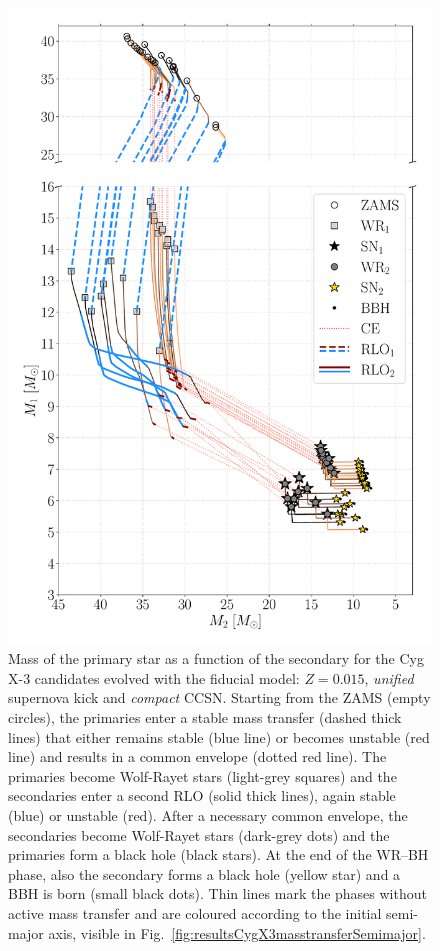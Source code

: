 \documentclass[a4paper,titlepage]{book}     	%
\begin{document}
\begin{figure}[h!]
	\centering
	\includegraphics[width=.9\textwidth]{./images/com_Mass_1_Mass_0_BHBH_GW_WRBH_cyg_x-3--Ko17.pdf}
	\caption{Mass of the primary star as a function of the secondary for the Cyg X-3 candidates evolved with the fiducial model: $Z=0.015$, \emph{unified} supernova kick and \emph{compact} CCSN. Starting from the ZAMS (empty circles), the primaries enter a stable mass transfer (dashed thick lines) that either remains stable (blue line) or becomes unstable (red line) and results in a common envelope (dotted red line). The primaries become Wolf-Rayet stars (light-grey squares) and the secondaries enter a second RLO (solid thick lines), again stable (blue) or unstable (red). After a necessary common envelope, the secondaries become Wolf-Rayet stars (dark-grey dots) and the primaries form a black hole (black stars). At the end of the WR--BH phase, also the secondary forms a black hole (yellow star) and a BBH is born (small black dots). Thin lines mark the phases without active mass transfer and are coloured according to the initial semi-major axis, visible in Fig.\ \ref{fig:resultsCygX3masstransferSemimajor}. }\label{fig:resultsCygX3masstransferM1M2}
\end{figure}
\end{document}
